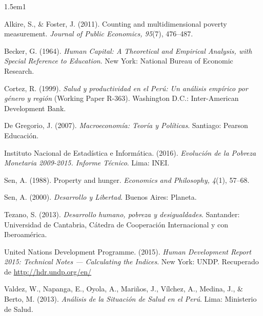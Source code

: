 \documentclass[12pt]{article}
\begin{document}
\begin{hangparas}{1.5em}{1}

Alkire, S., \& Foster, J. (2011). Counting and multidimensional poverty measurement.
\textit{Journal of Public Economics, 95}(7), 476--487.

Becker, G. (1964). \textit{Human Capital: A Theoretical and Empirical Analysis, with Special
Reference to Education}. New York: National Bureau of Economic Research.

Cortez, R. (1999). \textit{Salud y productividad en el Perú: Un análisis empírico por género y
región} (Working Paper R-363). Washington D.C.: Inter-American Development Bank.

De Gregorio, J. (2007). \textit{Macroeconomía: Teoría y Políticas}. Santiago: Pearson
Educación.

Instituto Nacional de Estadística e Informática. (2016). \textit{Evolución de la Pobreza
Monetaria 2009-2015. Informe Técnico}. Lima: INEI.

Sen, A. (1988). Property and hunger. \textit{Economics and Philosophy, 4}(1), 57--68.

Sen, A. (2000). \textit{Desarrollo y Libertad}. Buenos Aires: Planeta.

Tezano, S. (2013). \textit{Desarrollo humano, pobreza y desigualdades}. Santander: Universidad
de Cantabria, Cátedra de Cooperación Internacional y con Iberoamérica.

United Nations Development Programme. (2015). \textit{Human Development Report 2015:
Technical Notes --- Calculating the Indices}. New York: UNDP. Recuperado de
\url{http://hdr.undp.org/en/}

Valdez, W., Napanga, E., Oyola, A., Mariños, J., Vílchez, A., Medina, J., \& Berto, M. (2013).
\textit{Análisis de la Situación de Salud en el Perú}. Lima: Ministerio de Salud.

\end{hangparas}
\end{document}
